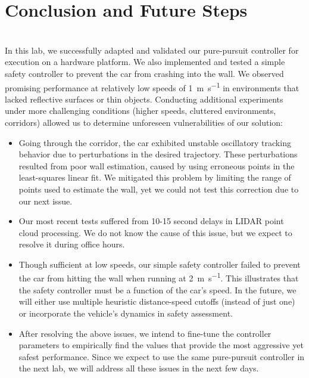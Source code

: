 \documentclass{article}
\begin{document}
\section{Conclusion and Future Steps}
\author{Savva Morozov} \\

In this lab, we successfully adapted and validated our pure-pursuit controller for execution on a hardware platform.
We also implemented and tested a simple safety controller to prevent the car from crashing into the wall.
We observed promising performance at relatively low speeds of 1~\si{\meter\per\second} in environments that lacked reflective surfaces or thin objects.
Conducting additional experiments under more challenging conditions (higher speeds, cluttered environments, corridors) allowed us to determine unforeseen vulnerabilities of our solution:

\begin{itemize}
  \item Going through the corridor, the car exhibited unstable oscillatory tracking behavior due to perturbations in the desired trajectory. 
  These perturbations resulted from poor wall estimation, caused by using erroneous points in the least-squares linear fit.
  We mitigated this problem by limiting the range of points used to estimate the wall, yet we could not test this correction due to our next issue.
  \item Our most recent tests suffered from 10-15 second delays in LIDAR point cloud processing.
  We do not know the cause of this issue, but we expect to resolve it during office hours.
  \item Though sufficient at low speeds, our simple safety controller failed to prevent the car from hitting the wall when running at 2~\si{\meter\per\second}.
  This illustrates that the safety controller must be a function of the car's speed.
  In the future, we will either use multiple heuristic distance-speed cutoffs (instead of just one) or incorporate the vehicle's dynamics in safety assessment.
  \item After resolving the above issues, we intend to fine-tune the controller parameters to empirically find the values that provide the most aggressive yet safest performance. 
  Since we expect to use the same pure-pursuit controller in the next lab, we will address all these issues in the next few days.
\end{itemize}
\end{document}
